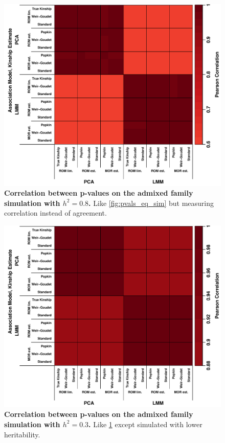 \documentclass[11pt]{article}
\begin{document}
\begin{figure}[bp!]
  \centering
  \includegraphics[width=\textwidth]{sim-admix-n1000-m100000-k3-f0.3-s0.5-mc100-h0.8-g20-fes/pvals_cor.pdf}
  \caption{
    {\bf Correlation between p-values on the admixed family simulation with $h^2=0.8$.}
    Like \cref{fig:pvals_eq_sim} but measuring correlation instead of agreement.
    }
  \label{fig:pvals_cor_sim}
\end{figure}

\begin{figure}[bp!]
  \centering
  \includegraphics[width=\textwidth]{sim-admix-n1000-m100000-k3-f0.3-s0.5-g20/h-0.3/pvals_cor.pdf}
  \caption{
    {\bf Correlation between p-values on the admixed family simulation with $h^2=0.3$.}
    Like \cref{fig:pvals_cor_sim} except simulated with lower heritability.
    }
  \label{fig:pvals_cor_sim-h3}
\end{figure}
\end{document}
